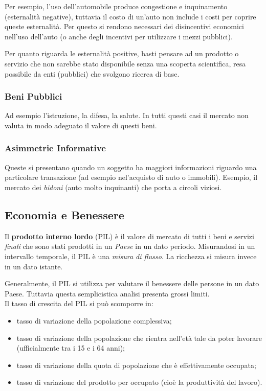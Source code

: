 \documentclass[a4paper,portrait,12pt]{article}
\theoremstyle{definition}
\begin{document}
Per esempio, l'uso dell'automobile produce congestione e inquinamento (esternalità negative), tuttavia il costo di un'auto non include i costi per coprire queste esternalità.
Per questo si rendono necessari dei disincentivi economici nell'uso dell'auto (o anche degli incentivi per utilizzare i mezzi pubblici).

Per quanto riguarda le esternalità positive, basti pensare ad un prodotto o servizio che non sarebbe stato disponibile senza una scoperta scientifica, resa possibile da enti (pubblici) che svolgono ricerca di base.

\subsubsection{Beni Pubblici}
Ad esempio l'istruzione, la difesa, la salute.
In tutti questi casi il mercato non valuta in modo adeguato il valore di questi beni.

\subsubsection{Asimmetrie Informative}
Queste si presentano quando un soggetto ha maggiori informazioni riguardo una particolare transazione (ad esempio nel'acquisto di auto o immobili).
Esempio, il mercato dei \emph{bidoni} (auto molto inquinanti) che porta a circoli viziosi.


\subsection{Economia e Benessere}

Il \textbf{prodotto interno lordo} (PIL) è il valore di mercato di tutti i beni e servizi \emph{finali} che sono stati prodotti in un \emph{Paese} in un dato periodo.
Misurandosi in un intervallo temporale, il PIL è una \emph{misura di flusso}.
La ricchezza si misura invece in un dato istante.

Generalmente, il PIL si utilizza per valutare il benessere delle persone in un dato Paese.
Tuttavia questa semplicistica analisi presenta grossi limiti.\\

Il tasso di crescita del PIL si può scomporre in:
\begin{itemize}
\item tasso di variazione della popolazione complessiva;
\item tasso di variazione della popolazione che rientra nell'età tale da poter lavorare (ufficialmente tra i 15 e i 64 anni);
\item tasso di variazione della quota di popolazione che è effettivamente occupata;
\item tasso di variazione del prodotto per occupato (cioè la produttività del lavoro).
\end{itemize}
\end{document}
